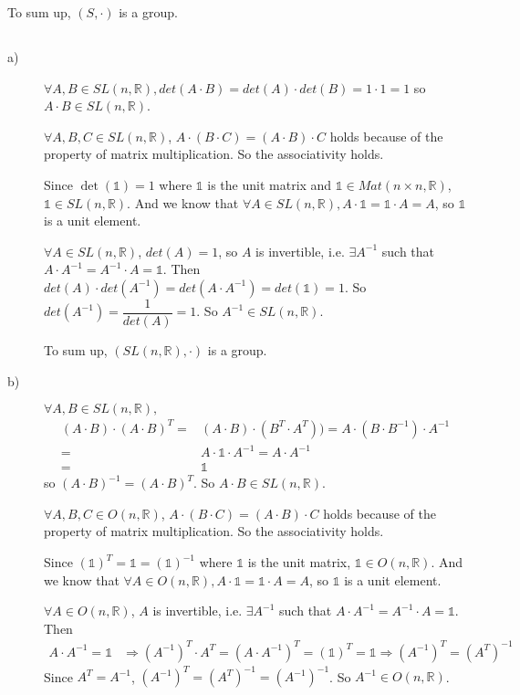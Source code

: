 \documentclass[a4paper,12pt,titlepage]{article}
\begin{document}
To sum up, $(S,\cdot)$ is a group.   

\subsection{}
\begin{description}
\item[a)]
$\forall A,B\in SL(n,\mathbb{R}),det(A\cdot B)=det(A)\cdot det(B)=1\cdot 1=1$
so $A\cdot B\in SL(n,\mathbb{R})$. 

$\forall A,B,C\in SL(n,\mathbb{R})$, $A\cdot(B\cdot C)=(A\cdot B)\cdot C$ holds because of the property of matrix multiplication. So the associativity holds.

Since $\det(\mathds{1})=1$ where $\mathds{1}$ is the unit matrix and $\mathds{1}\in Mat(n\times n,\mathbb{R})$, $\mathds{1}\in SL(n,\mathbb{R})$. And we know that $\forall A\in SL(n,\mathbb{R}),A\cdot\mathds{1}=\mathds{1}\cdot A=A$, so $\mathds{1}$ is a unit element.

$\forall A\in SL(n,\mathbb{R})$, $det(A)=1$, so $A$ is invertible, i.e. $\exists A^{-1}$ such that $A\cdot A^{-1}=A^{-1}\cdot A=\mathds{1}$. Then $det(A)\cdot det(A^{-1})=det(A\cdot A^{-1})=det(\mathds{1})=1$. So $det(A^{-1})=\dfrac{1}{det(A)}=1$. So $A^{-1}\in SL(n,\mathbb{R})$.

To sum up, $(SL(n,\mathbb{R}),\cdot)$ is a group.

\item[b)] 
$\forall A,B\in SL(n,\mathbb{R}),$
\begin{align*}
(A\cdot B)\cdot (A\cdot B)^T
=&(A\cdot B)\cdot (B^T\cdot A^T))
=A\cdot (B\cdot B^{-1})\cdot A^{-1}\\
=&A\cdot \mathds{1}\cdot A^{-1}
=A\cdot A^{-1}\\
=&\mathds{1}
\end{align*}
so $(A\cdot B)^{-1}= (A\cdot B)^T$. So $A\cdot B\in SL(n,\mathbb{R})$.

$\forall A,B,C\in O(n,\mathbb{R})$, $A\cdot(B\cdot C)=(A\cdot B)\cdot C$ holds because of the property of matrix multiplication. So the associativity holds.

Since $(\mathds{1})^T=\mathds{1}=(\mathds{1})^{-1}$ where $\mathds{1}$ is the unit matrix, $\mathds{1}\in O(n,\mathbb{R})$. And we know that $\forall A\in O(n,\mathbb{R}),A\cdot\mathds{1}=\mathds{1}\cdot A=A$, so $\mathds{1}$ is a unit element.

$\forall A\in O(n,\mathbb{R})$, $A$ is invertible,  i.e. $\exists A^{-1}$ such that $A\cdot A^{-1}=A^{-1}\cdot A=\mathds{1}$.  Then \begin{align*}
A\cdot A^{-1}=\mathds{1}&\Rightarrow (A^{-1})^T\cdot A^T=(A\cdot A^{-1})^T=(\mathds{1})^T=\mathds{1}\Rightarrow (A^{-1})^T= (A^T)^{-1}
\end{align*} Since $A^T=A^{-1}$, $(A^{-1})^T= (A^T)^{-1}=(A^{-1})^{-1}$. So $A^{-1}\in O(n,\mathbb{R})$.


\end{description}
\end{document}
